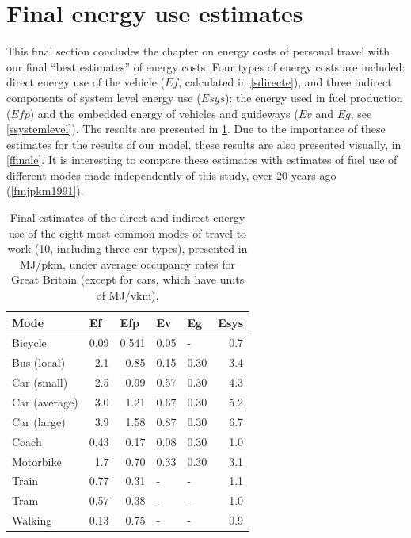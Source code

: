\section{Final energy use estimates} \label{sfinal} 
This final section concludes the chapter on energy costs of personal travel
with our final ``best estimates'' of energy costs. Four types of energy
costs are included: direct energy use of the vehicle ($Ef$, calculated
in \cref{sdirecte}), and three indirect components of system level energy
use ($Esys$): the energy used in fuel production ($Efp$) and the embedded
energy of vehicles and guideways ($Ev$ and $Eg$, see \cref{ssystemlevel}).
The results are presented in \cref{tfinale}. Due to the importance of these
estimates for the results of our model, these results are also presented
visually, in \cref{ffinale}. It is interesting to compare these estimates
with estimates of fuel use of different modes made independently of this
study, over 20 years ago (\cref{fmjpkm1991}).

\begin{table}[htbp]
\caption[Final estimates of the direct and indirect energy use of 8 modes]{Final
estimates of the direct and indirect energy use of the eight
most common modes of travel to work (10, including three car types),
presented in MJ/pkm, under average occupancy rates for Great Britain
(except for cars, which have units of MJ/vkm).}
\begin{center}
\begin{tabular}{lrrrrr}
\toprule
Mode & \multicolumn{1}{l}{Ef} & \multicolumn{1}{l}{Efp} & \multicolumn{1}{l}{Ev} & \multicolumn{1}{l}{Eg} & \multicolumn{1}{l}{Esys} \\
\midrule
Bicycle & 0.09 & 0.541 & 0.05 & \multicolumn{1}{l}{-} & 0.7 \\
Bus (local) & 2.1 & 0.85 & 0.15 & 0.30 & 3.4 \\
Car (small) & 2.5 & 0.99 & 0.57 & 0.30 & 4.3 \\
Car (average) & 3.0 & 1.21 & 0.67 & 0.30 & 5.2 \\
Car (large) & 3.9 & 1.58 & 0.87 & 0.30 & 6.7 \\
Coach & 0.43 & 0.17 & 0.08 & 0.30 & 1.0 \\
Motorbike & 1.7 & 0.70 & 0.33 & 0.30 & 3.1 \\
Train  & 0.77 & 0.31 & \multicolumn{1}{l}{-} & \multicolumn{1}{l}{-} & 1.1 \\
Tram & 0.57 & 0.38 & \multicolumn{1}{l}{-} & \multicolumn{1}{l}{-} & 1.0 \\
Walking & 0.13 & 0.75 & \multicolumn{1}{l}{-} & \multicolumn{1}{l}{-} & 0.9 \\ 
\bottomrule
\end{tabular}\end{center}
\label{tfinale}
\end{table}

